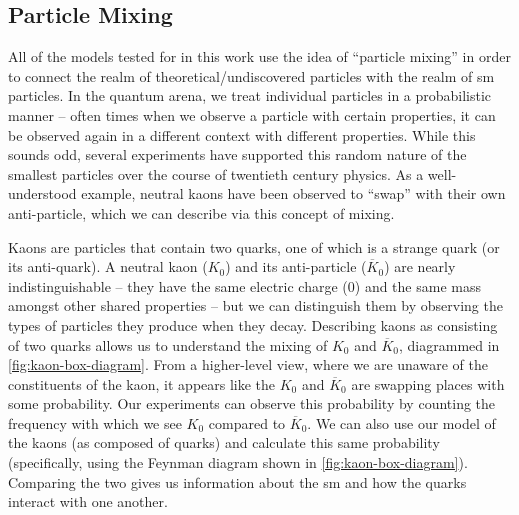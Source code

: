 \subsection{Particle Mixing}
All of the models tested for in this work use the idea of ``particle mixing'' in order
to connect the realm of theoretical/undiscovered particles with the realm of \ac{sm}
particles. In the quantum arena, we treat individual particles in a probabilistic
manner -- often times when we observe a particle with certain properties, it can
be observed again in a different context with different properties.
While this sounds odd, several experiments have supported this random nature
of the smallest particles over the course of twentieth century physics.
As a well-understood example, neutral kaons have been observed to ``swap'' with
their own anti-particle, which we can describe via this concept of mixing.

Kaons are particles that contain two quarks, one of which is a strange quark (or its
anti-quark). A neutral kaon (\(K_0\)) and its anti-particle (\(\overline{K}_0\)) are
nearly indistinguishable -- they have the same electric charge ($0$) and the same mass
amongst other shared properties -- but we can distinguish them by
observing the types of particles they produce when they decay.
Describing kaons as consisting of two quarks allows us to understand the mixing of \(K_0\)
and \(\overline{K}_0\), diagrammed in \cref{fig:kaon-box-diagram}. From a higher-level view,
where we are unaware of the constituents of the kaon, it appears like the \(K_0\)
and \(\overline{K}_0\) are swapping places with some probability.
Our experiments can observe this probability by counting the frequency with which we
see \(K_0\) compared to \(\overline{K}_0\).
We can also use our model of the kaons (as composed of quarks) and calculate this
same probability (specifically, using the Feynman diagram shown in \cref{fig:kaon-box-diagram}).
Comparing the two gives us information about the \ac{sm} and how the quarks
interact with one another.

